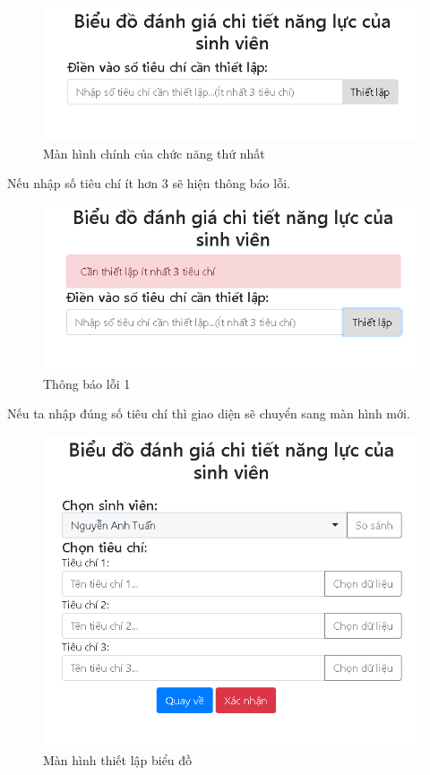 \begin{center}
	\begin{figure}[htp]
		\begin{center}
			\includegraphics[width=1\linewidth]{img/16}
		\end{center}
		\caption{Màn hình chính của chức năng thứ nhất}
		\label{refhinh48}
	\end{figure}
\end{center}

Nếu nhập số tiêu chí ít hơn 3 sẽ hiện thông báo lỗi.

\begin{center}
	\begin{figure}[htp]
		\begin{center}
			\includegraphics[width=1\linewidth]{img/17}
		\end{center}
		\caption{Thông báo lỗi 1}
		\label{refhinh49}
	\end{figure}
\end{center}

\newpage
Nếu ta nhập đúng số tiêu chí thì giao diện sẽ chuyển sang màn hình mới.

\begin{center}
	\begin{figure}[htp]
		\begin{center}
			\includegraphics[width=0.6\linewidth]{img/18}
		\end{center}
		\caption{Màn hình thiết lập biểu đồ}
		\label{refhinh50}
	\end{figure}
\end{center}

